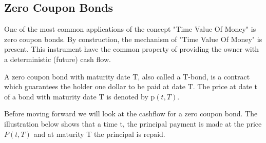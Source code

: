 \subsection{Zero Coupon Bonds}
One of the most common applications of the concept "Time Value Of Money" is zero coupon bonds. 
By construction, the mechanism of "Time Value Of Money" is present. This instrument 
have the common property of providing the owner with a deterministic (future) cash flow. 
\begin{definition}\label{def:zcb}
    A zero coupon bond with maturity date T, also called a T-bond, is a contract which 
    guarantees the holder one dollar to be paid at date T. The price at date t of 
    a bond with maturity date T is denoted by p$(t,T)$. \cite{Bjork} 
\end{definition} 
\noindent
Before moving forward we will look at the cashflow for a zero coupon bond. The illustration below shows that a time t,
the principal payment is made at the price $P(t,T)$ and at maturity T the principal is repaid.
\begin{center}
\end{center}
